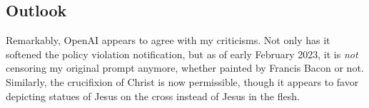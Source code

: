 \subsection{Outlook}
\label{sec:escape:outlook}

Remarkably, OpenAI appears to agree with my criticisms. Not only has it softened
the policy violation notification, but as of early February 2023, it is
\emph{not} censoring my original prompt anymore, whether painted by Francis
Bacon or not. Similarly, the crucifixion of Christ is now permissible, though it
appears to favor depicting statues of Jesus on the cross instead of Jesus in the
flesh.
